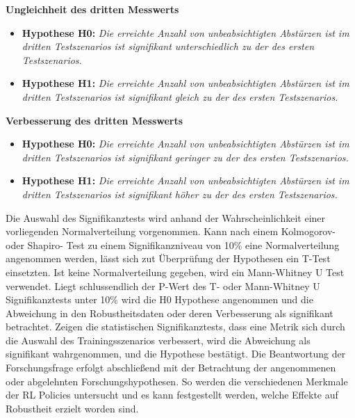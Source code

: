 \textbf{Ungleichheit des dritten Messwerts}
\begin{itemize}
    \item \textbf{Hypothese H0:} \textit{Die erreichte Anzahl von unbeabsichtigten Abstürzen ist im dritten Testszenarios ist signifikant unterschiedlich zu der des ersten Testszenarios.}
    \item \textbf{Hypothese H1:} \textit{Die erreichte Anzahl von unbeabsichtigten Abstürzen ist im dritten Testszenarios ist signifikant gleich zu der des ersten Testszenarios.}
\end{itemize}

\textbf{Verbesserung des dritten Messwerts}
\begin{itemize}
    \item \textbf{Hypothese H0:} \textit{Die erreichte Anzahl von unbeabsichtigten Abstürzen ist im dritten Testszenarios ist signifikant geringer zu der des ersten Testszenarios.}
    \item \textbf{Hypothese H1:} \textit{Die erreichte Anzahl von unbeabsichtigten Abstürzen ist im dritten Testszenarios ist signifikant höher zu der des ersten Testszenarios.}
\end{itemize}

Die Auswahl des Signifikanztests wird anhand der Wahrscheinlichkeit einer vorliegenden Normalverteilung vorgenommen.
Kann nach einem Kolmogorov- oder Shapiro- Test zu einem Signifikanzniveau von 10\% eine Normalverteilung angenommen werden, lässt sich zut Überprüfung der Hypothesen ein T-Test einsetzten.
Ist keine Normalverteilung gegeben, wird ein Mann-Whitney U Test verwendet.
Liegt schlussendlich der P-Wert des T- oder Mann-Whitney U Signifikanztests unter 10\% wird die H0 Hypothese angenommen und die Abweichung in den Robustheitsdaten oder deren Verbesserung als signifikant betrachtet.
Zeigen die statistischen Signifikanztests, dass eine Metrik sich durch die Auswahl des Trainingsszenarios verbessert, wird die Abweichung als signifikant wahrgenommen, und die Hypothese bestätigt.
Die Beantwortung der Forschungsfrage erfolgt abschließend mit der Betrachtung der angenommenen oder abgelehnten Forschungshypothesen.
So werden die verschiedenen Merkmale der RL Policies untersucht und es kann festgestellt werden, welche Effekte auf Robustheit erzielt worden sind.
